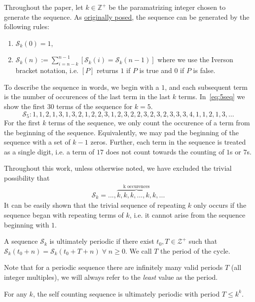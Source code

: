 \documentclass[12pt,reqno]{article}
\begin{document}
Throughout the paper, let $k\in\mathbb{Z}^{+}$ be the paramatrizing integer chosen to generate the sequence. As \href{https://www.reddit.com/r/math/comments/gdsjth/foggy_sequences/}{originally posed}, the sequence can be generated by the following rules:
\begin{enumerate}
  \item $\mathcal{S}_k(0) = 1$,
  \item $\mathcal{S}_k(n) := \sum\limits_{i=n-k}^{n-1} [ \mathcal{S}_k(i) = \mathcal{S}_k(n-1) ]$ where we use the Iverson bracket notation, i.e. $[P]$ returns $1$ if $P$ is true and $0$ if $P$ is false.
\end{enumerate}
To describe the sequence in words, we begin with a $1$, and each subsequent term is the number of occurences of the last term in the last $k$ terms. In~\eqref{eq:5seq} we show the first $30$ terms of the sequence for $k=5$.
\begin{equation}
  \mathcal{S}_5 : 1,1,2,1,3,1,3,2,1,2,2,3,1,2,3,2,2,3,2,3,2,3,3,3,4,1,1,2,1,3,\dots \label{eq:5seq}
\end{equation}
For the first $k$ terms of the sequence, we only count the occurence of a term from the beginning of the sequence. Equivalently, we may pad the beginning of the sequence with a set of $k-1$ zeros. Further, each term in the sequence is treated as a single digit, i.e. a term of $17$ does not count towards the counting of $1$s or $7$s. 

Throughout this work, unless otherwise noted, we have excluded the trivial possibility that  
\begin{align}
\mathcal{S}_k = ...,\overbrace{k,k,k,...,k,k}^{\textrm{k occurences}},...
\end{align}
It can be easily shown that the trivial sequence of repeating $k$ only occurs if the sequence began with repeating terms of $k$, i.e. it cannot arise from the sequence beginning with $1$. 

\begin{definition}\label{def:ultimatelyPeriodic}
A sequence $\mathcal{S}_k$ is ultimately periodic if there exist $t_0,T\in\mathcal{Z}^{+}$ such that $\mathcal{S}_k(t_0+n) = \mathcal{S}_k(t_0+T+n) \; \forall \; n \geq 0$. We call $T$ the period of the cycle.
\end{definition}
Note that for a periodic sequence there are infinitely many valid periods $T$ (all integer multiples), we will always refer to the \emph{least} value as the period. 

\begin{theorem}\label{thm:ultimatelyPeriodic}
For any $k$, the self counting sequence is ultimately periodic with period $T \leq k^k$. 
\end{theorem}
\end{document}

